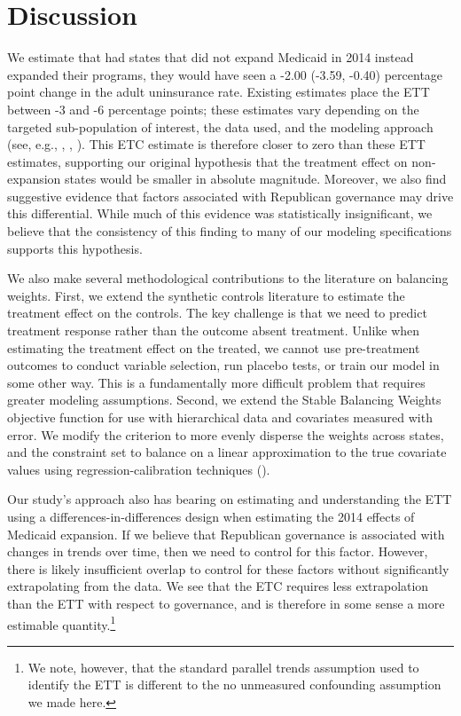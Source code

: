 \documentclass{article}
\begin{document}
\section{Discussion}

We estimate that had states that did not expand Medicaid in 2014 instead expanded their programs, they would have seen a -2.00 (-3.59, -0.40) percentage point change in the adult uninsurance rate. Existing estimates place the ETT between -3 and -6 percentage points; these estimates vary depending on the targeted sub-population of interest, the data used, and the modeling approach (see, e.g., \cite{courtemanche2017early}, \cite{kaestner2017effects}, \cite{frean2017premium}). This ETC estimate is therefore closer to zero than these ETT estimates, supporting our original hypothesis that the treatment effect on non-expansion states would be smaller in absolute magnitude. Moreover, we also find suggestive evidence that factors associated with Republican governance may drive this differential. While much of this evidence was statistically insignificant, we believe that the consistency of this finding to many of our modeling specifications supports this hypothesis.

We also make several methodological contributions to the literature on balancing weights. First, we extend the synthetic controls literature to estimate the treatment effect on the controls. The key challenge is that we need to predict treatment response rather than the outcome absent treatment. Unlike when estimating the treatment effect on the treated, we cannot use pre-treatment outcomes to conduct variable selection, run placebo tests, or train our model in some other way. This is a fundamentally more difficult problem that requires greater modeling assumptions. Second, we extend the Stable Balancing Weights objective function for use with hierarchical data and covariates measured with error. We modify the criterion to more evenly disperse the weights across states, and the constraint set to balance on a linear approximation to the true covariate values using regression-calibration techniques (\cite{gleser1992importance}).

Our study's approach also has bearing on estimating and understanding the ETT using a differences-in-differences design when estimating the 2014 effects of Medicaid expansion. If we believe that Republican governance is associated with changes in trends over time, then we need to control for this factor. However, there is likely insufficient overlap to control for these factors without significantly extrapolating from the data. We see that the ETC requires less extrapolation than the ETT with respect to governance, and is therefore in some sense a more estimable quantity.\footnote{We note, however, that the standard parallel trends assumption used to identify the ETT is different to the no unmeasured confounding assumption we made here.} 
\end{document}
